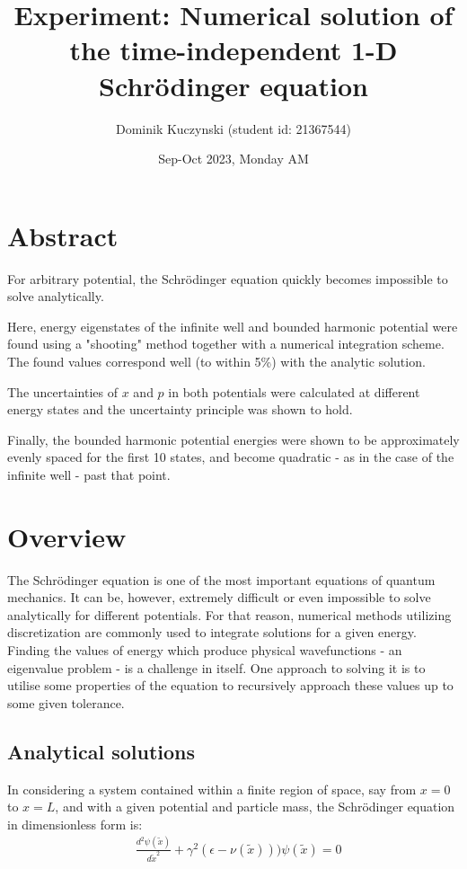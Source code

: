 \documentclass[11pt]{article}
\title{\textbf{Experiment: Numerical solution of the time-independent 1-D Schr{\"o}dinger equation}}
\author{Dominik Kuczynski (student id: 21367544)}
\date{Sep-Oct 2023, Monday AM}
\begin{document}
\maketitle

\tableofcontents

\newpage

\section{Abstract}

For arbitrary potential, the Schr{\"o}dinger equation quickly becomes
impossible to solve analytically. 

Here, energy eigenstates of the infinite well and bounded harmonic 
potential were found using a "shooting" method
together with a numerical integration scheme. The found values
correspond well (to within 5\%) with the analytic solution.

The uncertainties of $x$ and $p$ in both potentials were calculated
at different energy states and the uncertainty principle was shown
to hold.

Finally, the bounded harmonic potential energies were shown to be
approximately evenly spaced for the first 10 states, and become
quadratic - as in the case of the infinite well - past that point.


\section{Overview}

The Schr{\"o}dinger equation is one of the most important equations
of quantum mechanics. It can be, however, extremely difficult or
even impossible to solve analytically for different potentials. 
For that reason, numerical methods utilizing discretization are
commonly used to integrate solutions for a given energy. Finding the
values of energy which produce physical wavefunctions - an eigenvalue
problem - is a challenge in itself. One approach to solving it is
to utilise some properties of the equation to recursively approach
these values up to some given tolerance.

\subsection{Analytical solutions}

In considering a system contained within a finite region of space, say from
$x=0$ to $x=L$, and with a given potential and particle mass, the
Schr{\"o}dinger equation in dimensionless form is:
\begin{align}
     &\frac{d^2 \psi(\tilde{x})}{d\tilde{x}^2}+\gamma^2 (\epsilon-\nu(\tilde{x})))\psi(\tilde{x})=0
     \label{eq:2}
\end{align}
\end{document}
